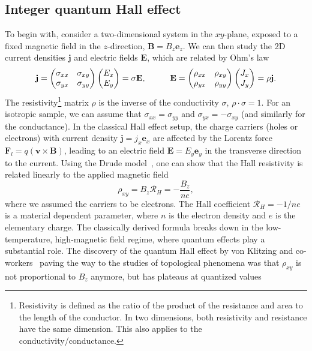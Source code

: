 \subsection{Integer quantum Hall effect}
\label{sec:iqhe}
To begin with, consider a two-dimensional system in the $xy$-plane, exposed to a fixed magnetic field in the $z$-direction, $\mathbf{B}  = B_z \mathbf{e}_z$. We can then study the 2D current densities $\mathbf{j}$ and electric fields $\mathbf{E}$, which are related by Ohm's law
\begin{equation}
\mathbf{j} = \begin{pmatrix}
\sigma_{xx} &  \sigma_{xy} \\
\sigma_{yx} & \sigma_{yy}
\end{pmatrix}
\begin{pmatrix}
E_x \\ E_y
\end{pmatrix} = \sigma \mathbf{E}, \hspace*{1cm} \mathbf{E} = \begin{pmatrix}
\rho_{xx} &  \rho_{xy} \\
\rho_{yx} & \rho_{yy}
\end{pmatrix}
\begin{pmatrix}
J_x \\ J_y
\end{pmatrix} = \rho \mathbf{j}.
\end{equation}
The resistivity\footnote{Resistivity is defined as the ratio of the product of the resistance and area to the length of the conductor. In two dimensions, both resistivity and resistance have the same dimension. This also applies to the conductivity/conductance.} matrix $\rho$ is the inverse of the conductivity $\sigma$, $\rho \cdot \sigma = 1$. For an isotropic sample, we can assume that $\sigma_{xx} = \sigma_{yy}$ and $\sigma_{yx} = - \sigma_{xy}$ (and similarly for the conductance). In the classical Hall effect setup, the charge carriers (holes or electrons) with current density $\mathbf{j} = j_x \mathbf{e}_x$ are affected by the Lorentz force $\mathbf{F}_l = q ( \mathbf{v} \times \mathbf{B} )$, leading to an electric field $\mathbf{E} = E_y \mathbf{e}_y $ in the transverse direction to the current. Using the Drude model~\cite{kittel1968introduction}, one can show that the Hall resistivity is related linearly to the applied magnetic field
\begin{equation}
\rho_{xy} =  B_z  \mathcal{R}_H = - \frac{B_z}{ne},
\end{equation}
where we assumed the carriers to be electrons. The Hall coefficient $ \mathcal{R}_H  = -1/ne$ is a material dependent parameter, where $n$ is the electron density and $e$ is the elementary charge. The classically derived formula breaks down in the low-temperature, high-magnetic field regime, where quantum effects play a substantial role. The discovery of the quantum Hall effect by von Klitzing and co-workers~\cite{IQHE1980} paving the way to the studies of topological phenomena was that $\rho_{xy}$ is not proportional to $B_z$ anymore, but has plateaus at quantized values
